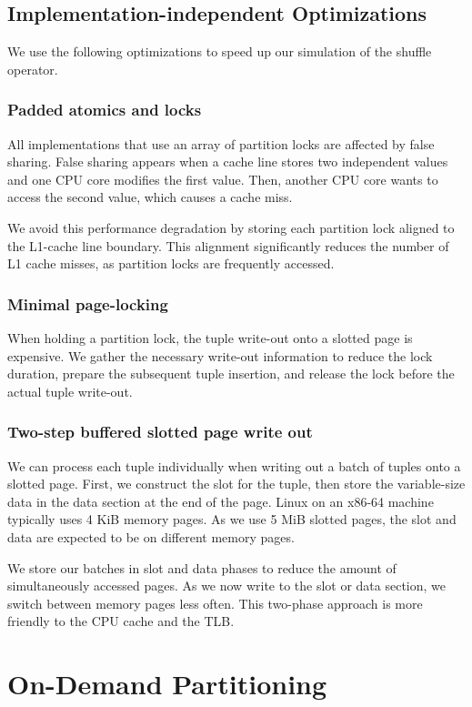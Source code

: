 \subsection{Implementation-independent Optimizations}
We use the following optimizations to speed up our simulation of the shuffle operator.
\subsubsection{Padded atomics and locks}
All implementations that use an array of partition locks are affected by false sharing.
False sharing appears when a cache line stores two independent values and one \ac{CPU} core modifies the first value.
Then, another CPU core wants to access the second value, which causes a cache miss.

We avoid this performance degradation by storing each partition lock aligned to the L1-cache line boundary.
This alignment significantly reduces the number of L1 cache misses, as partition locks are frequently accessed.

\subsubsection{Minimal page-locking}
When holding a partition lock, the tuple write-out onto a slotted page is expensive.
We gather the necessary write-out information to reduce the lock duration, prepare the subsequent tuple insertion, and release the lock before the actual tuple write-out.

\subsubsection{Two-step buffered slotted page write out}
We can process each tuple individually when writing out a batch of tuples onto a slotted page.
First, we construct the slot for the tuple, then store the variable-size data in the data section at the end of the page.
Linux on an x86-64 machine typically uses 4 KiB memory pages.
As we use 5 MiB slotted pages, the slot and data are expected to be on different memory pages.

We store our batches in slot and data phases to reduce the amount of simultaneously accessed pages.
As we now write to the slot or data section, we switch between memory pages less often.
This two-phase approach is more friendly to the \ac{CPU} cache and the \ac{TLB}.

\section{On-Demand Partitioning} \label{section-On-Demand-Partitioning}
